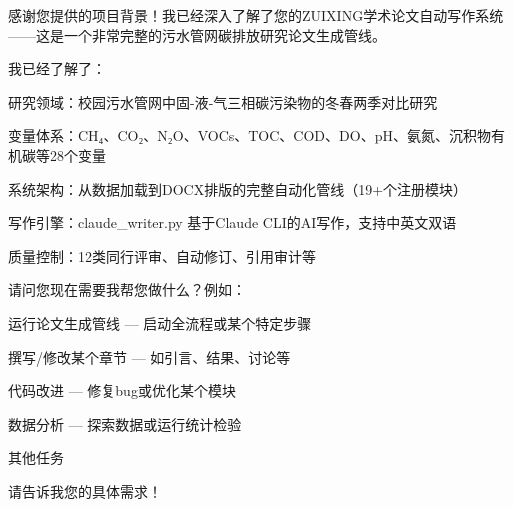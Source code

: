 感谢您提供的项目背景！我已经深入了解了您的ZUIXING学术论文自动写作系统——这是一个非常完整的污水管网碳排放研究论文生成管线。

我已经了解了：

\item 研究领域：校园污水管网中固-液-气三相碳污染物的冬春两季对比研究
\item 变量体系：CH₄、CO₂、N₂O、VOCs、TOC、COD、DO、pH、氨氮、沉积物有机碳等28个变量
\item 系统架构：从数据加载到DOCX排版的完整自动化管线（19+个注册模块）
\item 写作引擎：claude\_writer.py 基于Claude CLI的AI写作，支持中英文双语
\item 质量控制：12类同行评审、自动修订、引用审计等

请问您现在需要我帮您做什么？例如：

\item 运行论文生成管线 — 启动全流程或某个特定步骤
\item 撰写/修改某个章节 — 如引言、结果、讨论等
\item 代码改进 — 修复bug或优化某个模块
\item 数据分析 — 探索数据或运行统计检验
\item 其他任务

请告诉我您的具体需求！